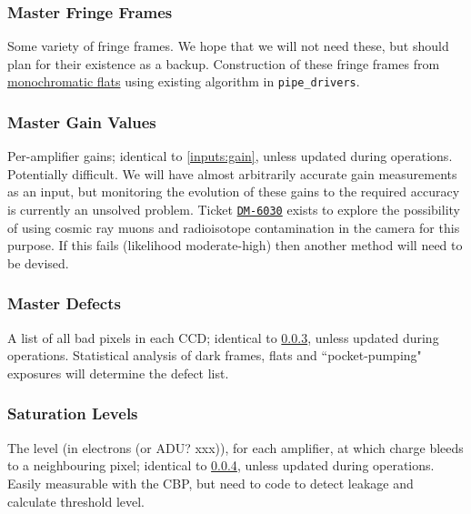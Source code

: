 \subsubsection{Master Fringe Frames}\label{calibProducts:fringeFrames}
Some variety of fringe frames. We hope that we will not need these, but should plan for their existence as a backup.
\alg Construction of these fringe frames from \hyperref[inputs:monoFlat]{monochromatic flats} using existing algorithm in \texttt{pipe\_drivers}.


\subsubsection{Master Gain Values}\label{calibProducts:gains}
Per-amplifier gains; identical to \ref{inputs:gain}, unless updated during operations.
\alg Potentially difficult. We will have almost arbitrarily accurate gain measurements as an input, but monitoring the evolution of these gains to the required accuracy is currently an unsolved problem. Ticket \hyperref{https://jira.lsstcorp.org/browse/DM-6030}{}{}{\texttt{DM-6030}} exists to explore the possibility of using cosmic ray muons and radioisotope contamination in the camera for this purpose. If this fails (likelihood moderate-high) then another method will need to be devised.

\subsubsection{Master Defects}\label{calibProducts:defectList}
A list of all bad pixels in each CCD; identical to \ref{calibProducts:defectList}, unless updated during operations.     
\alg Statistical analysis of dark frames, flats and ``pocket-pumping" exposures will determine the defect list.


\subsubsection{Saturation Levels}\label{calibProducts:saturationLevel}
The level (in electrons (or ADU? xxx)), for each amplifier, at which charge bleeds to a neighbouring pixel; identical to \ref{calibProducts:saturationLevel}, unless updated during operations.     
\alg Easily measurable with the CBP, but need to code to detect leakage and calculate threshold level. %


